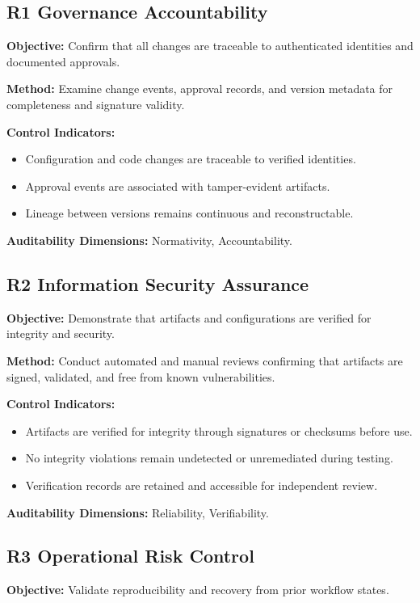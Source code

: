 \subsection*{R1 Governance Accountability}
\noindent
\textbf{Objective:} Confirm that all changes are traceable to authenticated
identities and documented approvals.  

\textbf{Method:} Examine change events, approval records, and version metadata
for completeness and signature validity.  

\textbf{Control Indicators:}
\begin{itemize}
  \item Configuration and code changes are traceable to verified identities.
  \item Approval events are associated with tamper-evident artifacts.
  \item Lineage between versions remains continuous and reconstructable.
\end{itemize}
\textbf{Auditability Dimensions:} Normativity, Accountability.

\subsection*{R2 Information Security Assurance}
\noindent
\textbf{Objective:} Demonstrate that artifacts and configurations are verified
for integrity and security.  

\textbf{Method:} Conduct automated and manual reviews confirming that artifacts
are signed, validated, and free from known vulnerabilities.  

\textbf{Control Indicators:}
\begin{itemize}
  \item Artifacts are verified for integrity through signatures or checksums
        before use.
  \item No integrity violations remain undetected or unremediated during testing.
  \item Verification records are retained and accessible for independent review.
\end{itemize}
\textbf{Auditability Dimensions:} Reliability, Verifiability.

\subsection*{R3 Operational Risk Control}
\noindent
\textbf{Objective:} Validate reproducibility and recovery from prior workflow
states.  

